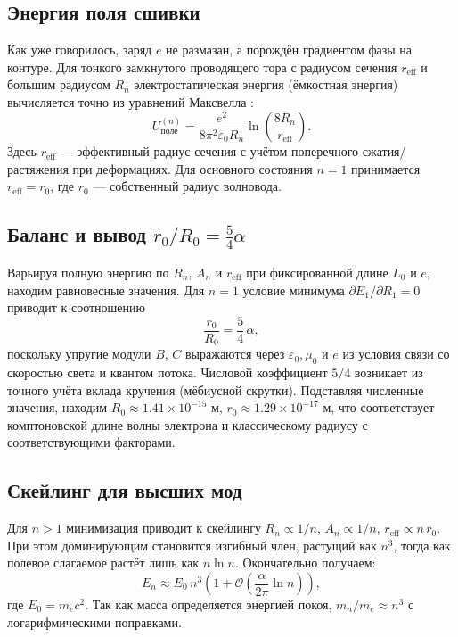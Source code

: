 \documentclass[12pt,a4paper]{article}
\begin{document}
	\subsection{Энергия поля сшивки}
	Как уже говорилось, заряд $e$ не размазан, а порождён градиентом фазы на контуре. Для тонкого замкнутого проводящего тора с радиусом сечения $r_{\text{eff}}$ и большим радиусом $R_n$ электростатическая энергия (ёмкостная энергия) вычисляется точно из уравнений Максвелла \cite{Landau}:
	\begin{equation}\label{eq:Ufield}
		U_{\text{поле}}^{(n)} = \frac{e^2}{8\pi^2\varepsilon_0 R_n}
		\ln\!\left(\frac{8R_n}{r_{\text{eff}}}\right).
	\end{equation}
	Здесь $r_{\text{eff}}$ — эффективный радиус сечения с учётом поперечного сжатия/растяжения при деформациях. Для основного состояния $n=1$ принимается $r_{\text{eff}} = r_0$, где $r_0$ — собственный радиус волновода.
	
	\subsection{Баланс и вывод $r_0/R_0 = \frac{5}{4}\alpha$}
	Варьируя полную энергию по $R_n$, $A_n$ и $r_{\text{eff}}$ при фиксированной длине $L_0$ и $e$, находим равновесные значения. Для $n=1$ условие минимума $\partial E_1/\partial R_1 = 0$ приводит к соотношению
	\begin{equation}\label{eq:geo}
		\frac{r_0}{R_0} = \frac{5}{4}\,\alpha,
	\end{equation}
	поскольку упругие модули $B$, $C$ выражаются через $\varepsilon_0,\mu_0$ и $e$ из условия связи со скоростью света и квантом потока. Числовой коэффициент $5/4$ возникает из точного учёта вклада кручения (мёбиусной скрутки). Подставляя численные значения, находим $R_0 \approx 1.41\times 10^{-15}$ м, $r_0 \approx 1.29\times 10^{-17}$ м, что соответствует комптоновской длине волны электрона и классическому радиусу с соответствующими факторами.
	
	\subsection{Скейлинг для высших мод}
	Для $n>1$ минимизация приводит к скейлингу $R_n \propto 1/n$, $A_n \propto 1/n$, $r_{\text{eff}} \propto n\,r_0$. При этом доминирующим становится изгибный член, растущий как $n^3$, тогда как полевое слагаемое растёт лишь как $n\ln n$. Окончательно получаем:
	\begin{equation}
		E_n \approx E_0\,n^3\left(1 + \mathcal{O}\!\left(\frac{\alpha}{2\pi}\ln n\right)\right),
	\end{equation}
	где $E_0 = m_e c^2$. Так как масса определяется энергией покоя, $m_n/m_e \approx n^3$ с логарифмическими поправками.
	
\end{document}
